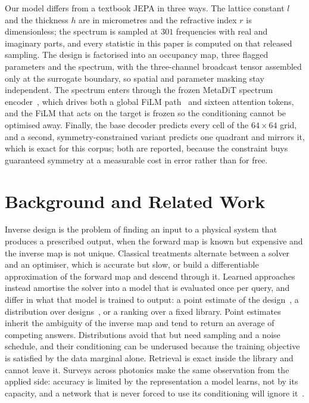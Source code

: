 \documentclass[pdflatex,oneside,sn-mathphys-num]{sn-jnl}
\theoremstyle{thmstyleone}
\theoremstyle{thmstyletwo}
\theoremstyle{thmstylethree}
\begin{document}
Our model differs from a textbook JEPA in three ways. The lattice constant $l$ and the thickness $h$ are in micrometres and the refractive index
$r$ is dimensionless; the spectrum is sampled at $301$ frequencies with real and imaginary
parts, and every statistic in this paper is computed on that released sampling. The design
is factorised into an
occupancy map, three flagged parameters and the spectrum, with the three-channel
broadcast tensor assembled only at the surrogate boundary, so spatial and parameter
masking stay independent. The spectrum enters through the frozen MetaDiT spectrum encoder~\cite{metadit}, which
drives both a global FiLM path~\cite{film} and sixteen attention tokens, and the FiLM that acts on
the target is frozen so the conditioning cannot be optimised away. Finally, the base decoder predicts every cell of the $64\times64$ grid, and a second,
symmetry-constrained variant predicts one quadrant and mirrors it, which is exact for this
corpus; both are reported, because the constraint buys guaranteed symmetry at a measurable
cost in error rather than for free.

\section{Background and Related Work}\label{sec2}

Inverse design is the problem of finding an input to a physical system that produces a
prescribed output, when the forward map is known but expensive and the inverse map is
not unique. Classical treatments alternate between a solver and an optimiser, which is
accurate but slow, or build a differentiable approximation of the forward map and
descend through it. Learned approaches instead amortise the solver into a model that is
evaluated once per query, and differ in what that model is trained to output: a point
estimate of the design~\cite{tandem,structuralcolor}, a distribution over
designs~\cite{genmodel}, or a ranking over a fixed library. Point
estimates inherit the ambiguity of the inverse map and tend to return an average of
competing answers. Distributions avoid that but need sampling and a noise schedule, and
their conditioning can be underused because the training objective is satisfied by the
data marginal alone. Retrieval is exact inside the library and cannot leave it. Surveys
across photonics make the same observation from the applied side: accuracy is limited
by the representation a model learns, not by its capacity, and a network that is never
forced to use its conditioning will ignore it~\cite{empowering,ailarge,deepmetasurfaces,largescale}.
\end{document}
